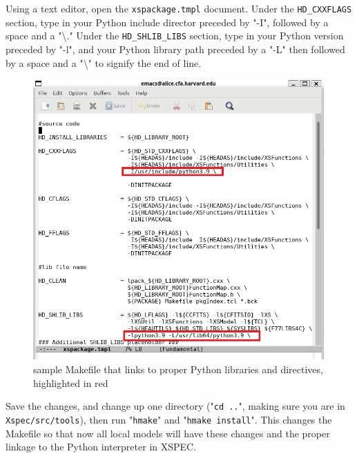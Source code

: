 \documentclass[12pt]{article}
\begin{document}
Using a text editor, open the \texttt {xspackage.tmpl} document. Under the \texttt{HD\_CXXFLAGS} section, type in your Python include director preceded by "-I", followed by a space and a "\textbackslash." Under the \texttt{HD\_SHLIB\_LIBS} section, type in your Python version preceded by "-l", and your Python library path preceded by a "-L" then followed by a space and a "\textbackslash" to signify the end of line. 
\begin{figure}[H]
	\centering
	\includegraphics[width = 15cm] {makefile}
	\caption{sample Makefile that links to proper Python libraries and directives, highlighted in red}
\end{figure}

Save the changes, and change up one directory ("\texttt{cd ..}", making sure you are in \texttt{Xspec/src/tools}), then run "\texttt{hmake}" and "\texttt{hmake install}". This changes the Makefile so that now all local models will have these changes and the proper linkage to the Python interpreter in  XSPEC. 
\end{document}
